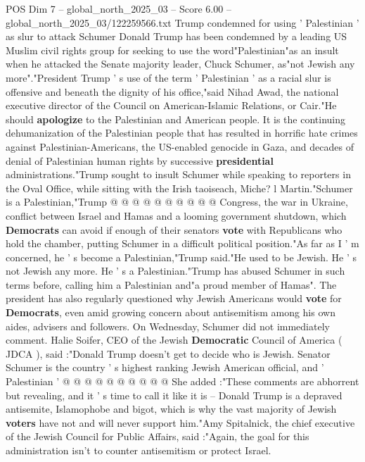\begin{textsample}{POS Dim 7 – global\_north\_2025\_03 – Score 6.00 – global\_north\_2025\_03/122259566.txt}  \label{ex:f7_pos_320}
Trump condemned for using ' Palestinian ' as slur to attack Schumer Donald Trump has been condemned by a leading US Muslim civil rights group for seeking to use the word"Palestinian"as an insult when he attacked the Senate majority leader, Chuck Schumer, as"not Jewish any more"."President Trump ' s use of the term ' Palestinian ' as a racial slur is offensive and beneath the dignity of his office,"said Nihad Awad, the national executive director of the Council on American-Islamic Relations, or Cair."He should \textbf{apologize} to the Palestinian and American people.
It is the continuing dehumanization of the Palestinian people that has resulted in horrific hate crimes against Palestinian-Americans, the US-enabled genocide in Gaza, and decades of denial of Palestinian human rights by successive \textbf{presidential} administrations."Trump sought to insult Schumer while speaking to reporters in the Oval Office, while sitting with the Irish taoiseach, Miche? l Martin."Schumer is a Palestinian,"Trump @ @ @ @ @ @ @ @ @ @ Congress, the war in Ukraine, conflict between Israel and Hamas and a looming government shutdown, which \textbf{Democrats} can avoid if enough of their senators \textbf{vote} with Republicans who hold the chamber, putting Schumer in a difficult political position."As far as I ' m concerned, he ' s become a Palestinian,"Trump said."He used to be Jewish.
He ' s not Jewish any more.
He ' s a Palestinian."Trump has abused Schumer in such terms before, calling him a Palestinian and"a proud member of Hamas".
The president has also regularly questioned why Jewish Americans would \textbf{vote} for \textbf{Democrats}, even amid growing concern about antisemitism among his own aides, advisers and followers.
On Wednesday, Schumer did not immediately comment.
Halie Soifer, CEO of the Jewish \textbf{Democratic} Council of America ( JDCA ), said :"Donald Trump doesn't get to decide who is Jewish.
Senator Schumer is the country ' s highest ranking Jewish American official, and ' Palestinian ' @ @ @ @ @ @ @ @ @ @ She added :"These comments are abhorrent but revealing, and it ' s time to call it like it is -- Donald Trump is a depraved antisemite, Islamophobe and bigot, which is why the vast majority of Jewish \textbf{voters} have not and will never support him."Amy Spitalnick, the chief executive of the Jewish Council for Public Affairs, said :"Again, the goal for this administration isn't to counter antisemitism or protect Israel.

\end{textsample}
